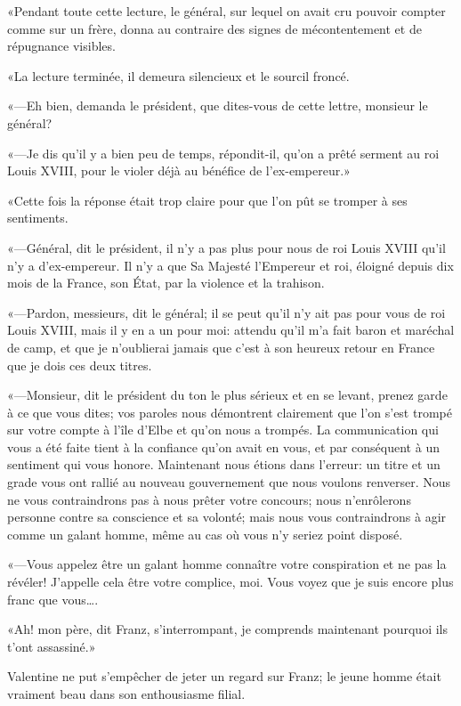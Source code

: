 «Pendant toute cette lecture, le général, sur lequel on avait cru pouvoir compter comme sur un frère, donna au contraire des signes de mécontentement et de répugnance visibles. 

«La lecture terminée, il demeura silencieux et le sourcil froncé. 

«—Eh bien, demanda le président, que dites-vous de cette lettre, monsieur le général? 

«—Je dis qu'il y a bien peu de temps, répondit-il, qu'on a prêté serment au roi Louis XVIII, pour le violer déjà au bénéfice de l'ex-empereur.» 

«Cette fois la réponse était trop claire pour que l'on pût se tromper à ses sentiments. 

«—Général, dit le président, il n'y a pas plus pour nous de roi Louis XVIII qu'il n'y a d'ex-empereur. Il n'y a que Sa Majesté l'Empereur et roi, éloigné depuis dix mois de la France, son État, par la violence et la trahison. 

«—Pardon, messieurs, dit le général; il se peut qu'il n'y ait pas pour vous de roi Louis XVIII, mais il y en a un pour moi: attendu qu'il m'a fait baron et maréchal de camp, et que je n'oublierai jamais que c'est à son heureux retour en France que je dois ces deux titres. 

«—Monsieur, dit le président du ton le plus sérieux et en se levant, prenez garde à ce que vous dites; vos paroles nous démontrent clairement que l'on s'est trompé sur votre compte à l'île d'Elbe et qu'on nous a trompés. La communication qui vous a été faite tient à la confiance qu'on avait en vous, et par conséquent à un sentiment qui vous honore. Maintenant nous étions dans l'erreur: un titre et un grade vous ont rallié au nouveau gouvernement que nous voulons renverser. Nous ne vous contraindrons pas à nous prêter votre concours; nous n'enrôlerons personne contre sa conscience et sa volonté; mais nous vous contraindrons à agir comme un galant homme, même au cas où vous n'y seriez point disposé. 

«—Vous appelez être un galant homme connaître votre conspiration et ne pas la révéler! J'appelle cela être votre complice, moi. Vous voyez que je suis encore plus franc que vous\dots.  

«Ah! mon père, dit Franz, s'interrompant, je comprends maintenant pourquoi ils t'ont assassiné.» 

Valentine ne put s'empêcher de jeter un regard sur Franz; le jeune homme était vraiment beau dans son enthousiasme filial. 

